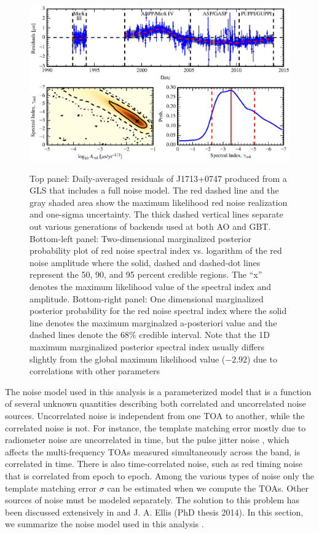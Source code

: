 %
\begin{figure}[!ht]
\centering
\includegraphics[scale=1.0]{fig3.eps} \\ 
\caption{\label{fig:res} Top panel: Daily-averaged residuals of J1713+0747 produced from a GLS that includes a 
full noise model. The red dashed line and the gray shaded area show the maximum likelihood red noise
realization and one-sigma uncertainty. The thick dashed vertical lines separate out various generations
of backends used at both AO and GBT.
Bottom-left panel: Two-dimensional marginalized posterior probability plot of red
noise spectral index vs. logarithm of the red noise amplitude where the solid, dashed and
dashed-dot lines represent the 50, 90, and 95 percent credible regions. The ``x'' denotes
the maximum likelihood value of the spectral index and amplitude.
Bottom-right panel: One dimensional marginalized posterior probability for the
red noise spectral index where the solid line denotes the maximum marginalzed a-posteriori
value and the dashed lines denote the 68\% credible interval. Note that the
1D maximum marginalized posterior spectral index usually differs slightly from the
global maximum likelihood value ($-2.92$) due to correlations with other parameters}
\end{figure} 
%
The noise model used in this analysis is a parameterized model that is a function of several unknown quantities describing both correlated and uncorrelated noise sources. Uncorrelated noise is 
independent from one TOA to another, while the correlated noise is not. 
For instance, the template matching error mostly due to radiometer noise are
uncorrelated in time, but the pulse jitter noise \citep{cs10}, which affects
the multi-frequency TOAs measured simultaneously across the band, is correlated in time.
There is also time-correlated noise, such as red timing noise that is
correlated from epoch to epoch. Among the various types of noise only the
template matching error $\sigma$ can be estimated when we compute the TOAs.
Other sources of noise must be modeled separately. The solution to this problem has been discussed extensively in \citet{vl13, ell13, vv14a, vv14, abb+14} and J. A. Ellis (PhD thesis 2014). In this section, we summarize the noise model used in this analysis \citep[see e.g.][for more details]{abb+15b}.



